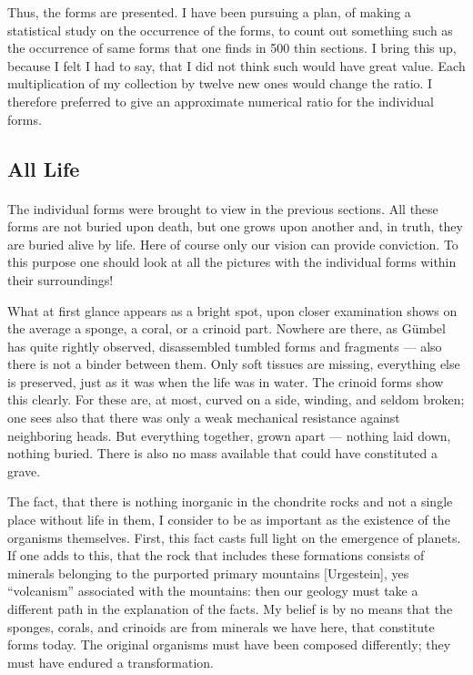 \documentclass[a4paper, 12pt, oneside]{article}
\begin{document}
Thus, the forms are presented. I have been pursuing a plan, of making a statistical study on the occurrence of the forms, to count out something such as the occurrence of same forms that one finds in 500 thin sections. I bring this up, because I felt I had to say, that I did not think such would have great value. Each multiplication of my collection by twelve new ones would change the ratio. I therefore preferred to give an approximate numerical ratio for the individual forms.
\clearpage
\subsection{All Life}
\paragraph*{}
The individual forms were brought to view in the previous sections. All these forms are not buried upon death, but one grows upon another and, in truth, they are buried alive by life. Here of course only our vision can provide conviction. To this purpose one should look at all the pictures with the individual forms within their surroundings!

What at first glance appears as a bright spot, upon closer examination shows on the average a sponge, a coral, or a crinoid part. Nowhere are there, as Gümbel has quite rightly observed, disassembled tumbled forms and fragments --- also there is not a binder between them. Only soft tissues are missing, everything else is preserved, just as it was when the life was in water. The crinoid forms show this clearly. For these are, at most, curved on a side, winding, and seldom broken; one sees also that there was only a weak mechanical resistance against neighboring heads. But everything together, grown apart --- nothing laid down, nothing buried. There is also no mass available that could have constituted a grave.

The fact, that there is nothing inorganic in the chondrite rocks and not a single place without life in them, I consider to be as important as the existence of the organisms themselves. First, this fact casts full light on the emergence of planets. If one adds to this, that the rock that includes these formations consists of minerals belonging to the purported primary mountains [Urgestein], yes ``volcanism'' associated with the mountains: then our geology must take a different path in the explanation of the facts. My belief is by no means that the sponges, corals, and crinoids are from minerals we have here, that constitute forms today. The original organisms must have been composed differently; they must have endured a transformation.
\end{document}
